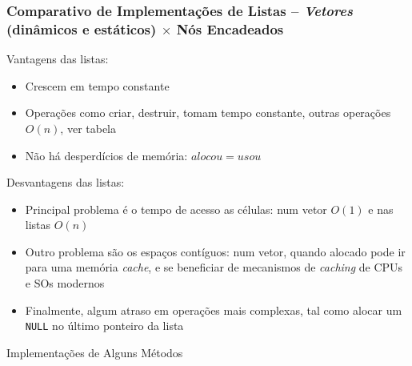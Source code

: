 \begin{frame}
\frametitle{Comparativo de Implementações de Listas --
\textit{Vetores} (dinâmicos e estáticos) $\times$ Nós Encadeados}

\begin{block}{Vantagens das listas:}
\begin{itemize}
  \item Crescem em tempo constante
  \item Operações como criar, destruir, tomam tempo constante, outras operações $O(n)$, ver tabela
  \item Não há desperdícios de memória: $alocou = usou$
\end{itemize}
\end{block}


\begin{block}{Desvantagens das listas:}
\begin{itemize}
  \item Principal problema é o tempo de acesso as células: num vetor $O(1)$ e nas listas $O(n)$
  \item Outro problema são os espaços contíguos: num vetor, quando alocado pode ir para uma memória \textit{cache}, e se beneficiar de mecanismos de \textit{caching} de CPUs e SOs modernos
  \item Finalmente, algum atraso em operações mais complexas, tal 
  como alocar um \texttt{NULL} no último ponteiro da lista
\end{itemize}

\end{block}

\end{frame} 


\begin{frame}%

\begin{center}
{\huge Implementações de Alguns Métodos}
\end{center}
\end{frame} 



